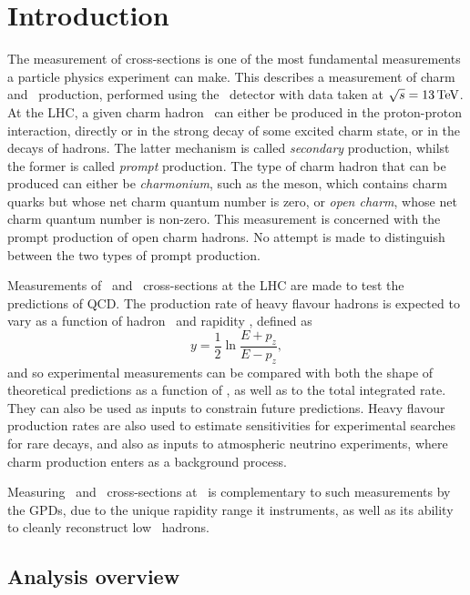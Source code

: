\chapter{Introduction}
\label{chap:prod:introduction}

The measurement of cross-sections is one of the most fundamental measurements a 
particle physics experiment can make.
This  describes a measurement of charm and \ccbar\ 
production, performed using the \lhcb\ detector with data taken at $\sqrts = 
\SI{13}{\TeV}$.
At the \ac{LHC}, a given charm hadron \PHc\ can either be produced in the 
proton-proton interaction, directly or in the strong decay of some excited 
charm state, or in the decays of \PB hadrons.
The latter mechanism is called \emph{secondary} production, whilst the former is called \emph{prompt} production.
The type of charm hadron that can be produced can either be \emph{charmonium}, such as the \PJpsi meson, which contains charm quarks but whose net charm quantum number is zero, or \emph{open charm}, whose net charm quantum number is non-zero.
This measurement is concerned with the prompt production of open charm hadrons.
No attempt is made to distinguish between the two types of prompt production.

Measurements of \ccbar\ and \bbbar\ cross-sections at the \ac{LHC} are made to 
test the predictions of \acf{QCD}.
The production rate of heavy flavour hadrons is expected to vary as a function 
of hadron \pT\ and rapidity \rapidity, defined as
\begin{equation}
  y = \frac{1}{2}\ln{\frac{E + p_{z}}{E - p_{z}}},
  \label{eqn:prod:introduction:rapidity}
\end{equation}
and so experimental measurements can be compared with both the shape of 
theoretical predictions as a function of \pTy, as well as to the total 
integrated rate.
They can also be used as inputs to constrain future predictions.
Heavy flavour production rates are also used to estimate sensitivities for experimental searches 
for rare decays, and also as inputs to 
atmospheric neutrino experiments, where charm production enters as a background 
process.

Measuring \ccbar\ and \bbbar\ cross-sections at \lhcb\ is complementary to such 
measurements by the \acp{GPD}, due to the unique rapidity range it instruments, 
as well as its ability to cleanly reconstruct low \pT\ hadrons.

\section{Analysis overview}
\label{chap:prod:introduction:analysis_overview}

